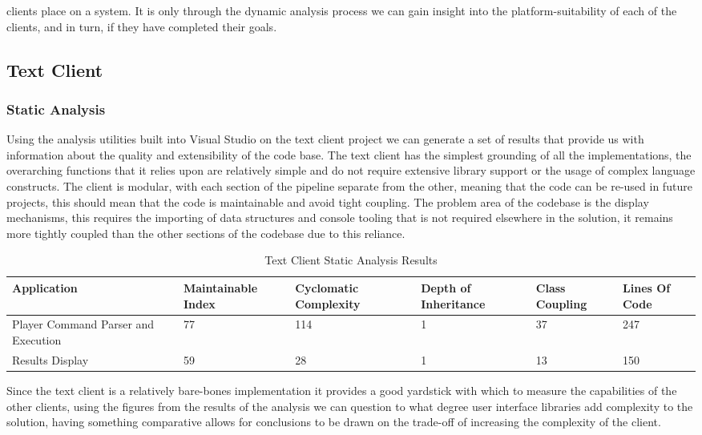 \documentclass{article}
\begin{document}
clients place on a system. It is only through the dynamic analysis process we can gain insight into the platform-suitability of each of the clients, and in turn, if they have completed their goals.
\subsection{Text Client}
\subsubsection{Static Analysis}
Using the analysis utilities built into Visual Studio on the text client project we can generate a set of results that provide us with information about the quality and extensibility of the code base. The text client has the simplest grounding of all the implementations, the overarching functions that it relies upon are relatively simple and do not require extensive library support or the usage of complex language constructs. The client is modular, with each section of the pipeline separate from the other, meaning that the code can be re-used in future projects, this should mean that the code is maintainable and avoid tight coupling. The problem area of the codebase is the display mechanisms, this requires the importing of data structures and console tooling that is not required elsewhere in the solution, it remains more tightly coupled than the other sections of the codebase due to this reliance.
\begin{table}[H]
	\centering
	\caption{Text Client Static Analysis Results}
	\label{my-label}
	\begin{tabularx}{\textwidth}{|X|X|X|X|X|X|}
		\hline
		\textbf{Application} & \textbf{Maintainable Index} & \textbf{Cyclomatic Complexity} & \textbf{Depth of Inheritance} & \textbf{Class Coupling} & \textbf{Lines Of Code} \\ \hline
		Player Command Parser and Execution & 77 &      114     &     1      &    37       &     247      \\ \hline
		Results Display & 59 &       28    &       1    &     13      &       150    \\ \hline
	\end{tabularx}
\end{table}
Since the text client is a relatively bare-bones implementation it provides a good yardstick with which to measure the capabilities of the other clients, using the figures from the results of the analysis we can question to what degree user interface libraries add complexity to the solution, having something comparative allows for conclusions to be drawn on the trade-off of increasing the complexity of the client.
\end{document}
